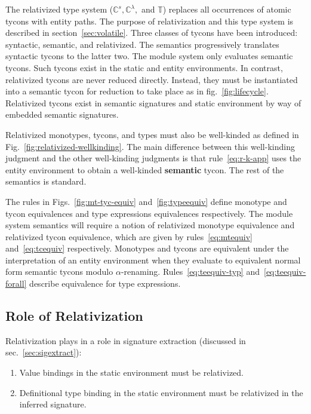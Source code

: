 The relativized type system ($\mathbb{C}^s, \mathbb{C}^\lambda,$ and $\mathbb{T}$) replaces all occurrences of atomic tycons with entity paths. The purpose of relativization and this type system is described in section~\ref{sec:volatile}. Three classes of tycons have been introduced: syntactic, semantic, and relativized. The semantics progressively translates syntactic tycons to the latter two. The module system only evaluates semantic tycons. Such tycons exist in the static and entity environments. In contrast, relativized tycons are never reduced directly. Instead, they must be instantiated into a semantic tycon for reduction to take place as in fig.~\ref{fig:lifecycle}. Relativized tycons exist in semantic signatures and static environment by way of embedded semantic signatures. 



Relativized monotypes, tycons, and types must also be well-kinded as
defined in Fig.~\ref{fig:relativized-wellkinding}. The main difference
between this well-kinding judgment and the other well-kinding
judgments is that rule~\ref{eq:r-k-app} uses the entity environment to
obtain a well-kinded {\bf semantic} tycon. The rest of the semantics
is standard. 
 


The rules in Figs.~\ref{fig:mt-tyc-equiv} and~\ref{fig:typeequiv}
define monotype and tycon equivalences and type expressions
equivalences respectively.   
The module system semantics will require a notion of relativized monotype equivalence and relativized tycon equivalence, which are given by rules~\ref{eq:mtequiv} and~\ref{eq:tcequiv} respectively.  Monotypes and tycons are equivalent under the interpretation of an entity environment when they evaluate to equivalent normal form semantic tycons modulo $\alpha$-renaming. Rules~\ref{eq:teequiv-typ} and~\ref{eq:teequiv-forall} describe equivalence for type expressions. 

\subsection{Role of Relativization}
Relativization plays in a role in signature extraction (discussed in sec.~\ref{sec:sigextract}):
\begin{enumerate}
\item Value bindings in the static environment must be relativized. 
\item Definitional type binding in the static environment must be relativized in the inferred signature. 
\end{enumerate}
        
